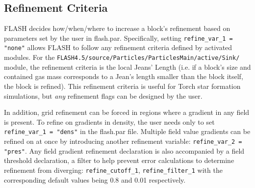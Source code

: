 \documentclass[10pt]{article}
\begin{document}
\subsection{Refinement Criteria}

FLASH decides how/when/where to increase a block's refinement based on parameters set by the user in flash.par. Specifically, setting \texttt{refine\_var\_1 = "none"} allows FLASH to follow any refinement criteria defined by activated modules. For the \texttt{FLASH4.5/source/Particles/ParticlesMain/active/Sink/} module, the refinement criteria is the local Jeans' Length (i.e. if a block's size and contained gas mass corresponds to a Jean's length smaller than the block itself, the block is refined). This refinement criteria is useful for Torch star formation simulations, but \emph{any} refinement flags can be designed by the user.

In addition, grid refinement can be forced in regions where a gradient in any field is present. To refine on gradients in density, the user needs only to set \texttt{refine\_var\_1 = "dens"} in the flash.par file. Multiple field value gradients can be refined on at once by introducing another refinement variable: \texttt{refine\_var\_2 = "pres"}. Any field gradient refinement declaration is also accompanied by a field threshold declaration, a filter to help prevent error calculations to determine refinement from diverging: \texttt{refine\_cutoff\_1}, \texttt{refine\_filter\_1} with the corresponding default values being 0.8 and 0.01 respectively.

\end{document}
